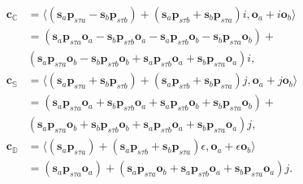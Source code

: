 \documentclass[letterpaper]{article} %
\begin{document}
\begin{equation}
\begin{split}
   \boldsymbol{c}_\mathbb{C} & =  \langle (\boldsymbol{s}_{a} \boldsymbol{p}_{s \tau a} - \boldsymbol{s}_{b} \boldsymbol{p}_{s \tau b}) + (\boldsymbol{s}_{a} \boldsymbol{p}_{s \tau b} + \boldsymbol{s}_{b} \boldsymbol{p}_{s \tau a}) i, \boldsymbol{o}_{a} + i \boldsymbol{o}_{b} \rangle \\
    &= (\boldsymbol{s}_{a} \boldsymbol{p}_{s \tau a} \boldsymbol{o}_{a} - \boldsymbol{s}_{b} \boldsymbol{p}_{s \tau b} \boldsymbol{o}_{a} - \boldsymbol{s}_{a} \boldsymbol{p}_{s \tau b} \boldsymbol{o}_{b} - \boldsymbol{s}_{b} \boldsymbol{p}_{s \tau a} \boldsymbol{o}_{b}) + \\
    & (\boldsymbol{s}_{a} \boldsymbol{p}_{s \tau a} \boldsymbol{o}_{b} - \boldsymbol{s}_{b} \boldsymbol{p}_{s \tau b} \boldsymbol{o}_{b} + \boldsymbol{s}_{a} \boldsymbol{p}_{s \tau b} \boldsymbol{o}_{a} + \boldsymbol{s}_{b} \boldsymbol{p}_{s \tau a} \boldsymbol{o}_{a}) i, \\
    \boldsymbol{c}_\mathbb{S} &  =
    \langle (\boldsymbol{s}_{a} \boldsymbol{p}_{s \tau a} + \boldsymbol{s}_{b} \boldsymbol{p}_{s \tau b}) + (\boldsymbol{s}_{a} \boldsymbol{p}_{s \tau b} + \boldsymbol{s}_{b} \boldsymbol{p}_{s \tau a}) j, \boldsymbol{o}_{a} + j \boldsymbol{o}_{b} \rangle \\
    &= (\boldsymbol{s}_{a} \boldsymbol{p}_{s \tau a} \boldsymbol{o}_{a} + \boldsymbol{s}_{b} \boldsymbol{p}_{s \tau b} \boldsymbol{o}_{a} + \boldsymbol{s}_{a} \boldsymbol{p}_{s \tau b} \boldsymbol{o}_{b} + \boldsymbol{s}_{b} \boldsymbol{p}_{s \tau a} \boldsymbol{o}_{b})
    + \\
    &(\boldsymbol{s}_{a} \boldsymbol{p}_{s \tau a} \boldsymbol{o}_{b} + \boldsymbol{s}_{b} \boldsymbol{p}_{s \tau b} \boldsymbol{o}_{b} + \boldsymbol{s}_{a} \boldsymbol{p}_{s \tau b} \boldsymbol{o}_{a} + \boldsymbol{s}_{b} \boldsymbol{p}_{s \tau a} \boldsymbol{o}_{a}) j,\\
         \boldsymbol{c}_\mathbb{D}  & =
    \langle (\boldsymbol{s}_{a} \boldsymbol{p}_{s \tau a}) + (\boldsymbol{s}_{a} \boldsymbol{p}_{s \tau b} + \boldsymbol{s}_{b} \boldsymbol{p}_{s \tau a}) \epsilon, \boldsymbol{o}_{a} + \epsilon \boldsymbol{o}_{b} \rangle \\
    &= (\boldsymbol{s}_{a} \boldsymbol{p}_{s \tau a} \boldsymbol{o}_{a}) + (\boldsymbol{s}_{a} \boldsymbol{p}_{s \tau a} \boldsymbol{o}_{b} + \boldsymbol{s}_{a} \boldsymbol{p}_{s \tau b} \boldsymbol{o}_{a} + \boldsymbol{s}_{b} \boldsymbol{p}_{s \tau a} \boldsymbol{o}_{a}) j.
\end{split}
\end{equation}
\end{document}
